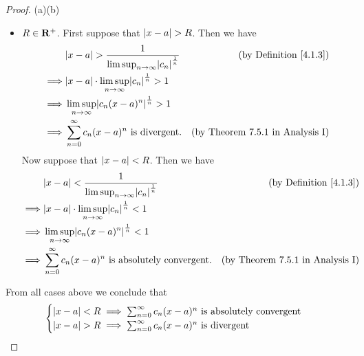 \begin{proof}{(a)}{(b)}
\begin{itemize}
        \item \(R \in \mathbf{R}^+\).
              First suppose that \(\left\lvert x - a\right\rvert > R\).
              Then we have
              \begin{align*}
                           & \abs{x - a} > \frac{1}{\limsup_{n \to \infty} \abs{c_n}^{\frac{1}{n}}} & \text{(by Definition \ref{4.1.3})}      \\
                  \implies & \abs{x - a} \cdot \limsup_{n \to \infty} \abs{c_n}^{\frac{1}{n}} > 1                                             \\
                  \implies & \limsup_{n \to \infty} \abs{c_n (x - a)^n}^{\frac{1}{n}} > 1                                                     \\
                  \implies & \sum_{n = 0}^\infty c_n (x - a)^n \text{ is divergent}.                & \text{(by Theorem 7.5.1 in Analysis I)}
              \end{align*}
              Now suppose that \(\left\lvert x - a\right\rvert < R\).
              Then we have
              \begin{align*}
                           & \abs{x - a} < \frac{1}{\limsup_{n \to \infty} \abs{c_n}^{\frac{1}{n}}} & \text{(by Definition \ref{4.1.3})}      \\
                  \implies & \abs{x - a} \cdot \limsup_{n \to \infty} \abs{c_n}^{\frac{1}{n}} < 1                                             \\
                  \implies & \limsup_{n \to \infty} \abs{c_n (x - a)^n}^{\frac{1}{n}} < 1                                                     \\
                  \implies & \sum_{n = 0}^\infty c_n (x - a)^n \text{ is absolutely convergent}.    & \text{(by Theorem 7.5.1 in Analysis I)}
              \end{align*}
    \end{itemize}
    From all cases above we conclude that
    \[
        \begin{cases}
            \left\lvert x - a\right\rvert < R \implies \sum_{n = 0}^\infty c_n (x - a)^n \text{ is absolutely convergent} \\
            \left\lvert x - a\right\rvert > R \implies \sum_{n = 0}^\infty c_n (x - a)^n \text{ is divergent}
        \end{cases}
    \]
\end{proof}

